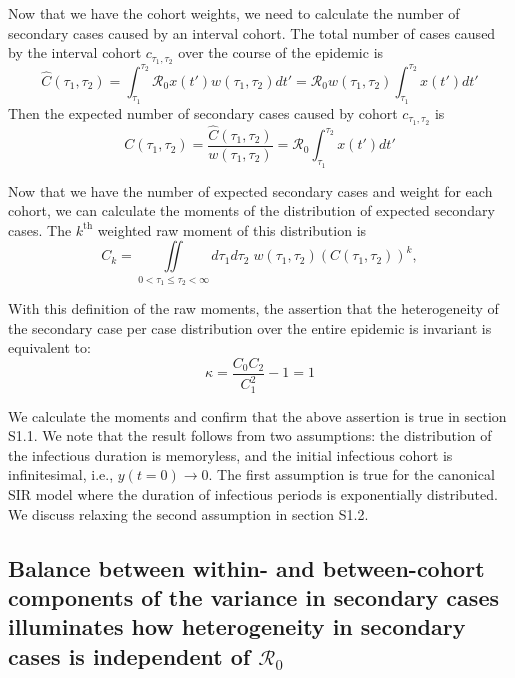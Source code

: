 Now that we have the cohort weights, we need to calculate the number of secondary cases caused by an interval cohort. The total number of cases caused by the interval cohort $c_{\tau_1,\tau_2}$ over the course of the epidemic is 
\begin{equation}
    \hat{C}(\tau_1, \tau_2) = \int_{\tau_1}^{\tau_2} \mathcal{R}_0 x(t') w(\tau_1,\tau_2)dt' = \mathcal{R}_0 w(\tau_1, \tau_2) \int_{\tau_1}^{\tau_2} x(t')dt'
\end{equation}
Then the expected number of secondary cases caused by cohort $c_{\tau_1,\tau_2}$ is
\begin{equation}
    C(\tau_1,\tau_2) = \frac{\hat{C}(\tau_1,\tau_2)}{w(\tau_1,\tau_2)} = \mathcal{R}_0 \int_{\tau_1}^{\tau_2} x(t')dt' 
\end{equation}

Now that we have the number of expected secondary cases and weight for each cohort, we can calculate the moments of the distribution of expected secondary cases. The $k^{\text{th}}$ weighted raw moment of this distribution is
\begin{equation}
    C_k = \iint\limits_{0 < \tau_1 \leq \tau_2 < \infty}  d\tau_1 d\tau_2 \; w(\tau_1,\tau_2) (C(\tau_1 ,\tau_2))^k,
\end{equation}

With this definition of the raw moments, the assertion that the heterogeneity of the secondary case per case distribution over the entire epidemic is invariant is equivalent to:
\begin{equation}
    \kappa = \frac{C_0 C_2}{C_1^2} - 1 = 1 \label{eq:target_main}
\end{equation}

We calculate the moments and confirm that the above assertion is true in section S1.1. We note that the result follows from two assumptions: the distribution of the infectious duration is memoryless, and the initial infectious cohort is infinitesimal, i.e., $y(t = 0) \rightarrow 0$. The first assumption is true for the canonical SIR model where the duration of infectious periods is exponentially distributed. We discuss relaxing the second assumption in section S1.2.

\subsection{Balance between within- and between-cohort components of the variance in secondary cases illuminates how heterogeneity in secondary cases is independent of $\mathcal{R}_0$}

